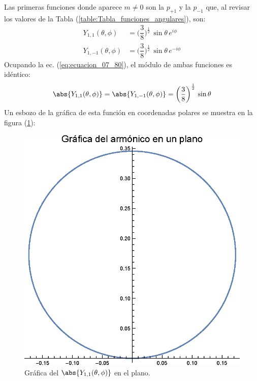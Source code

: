 Las primeras funciones donde aparece $m \neq 0$ son la $p_{+1}$ y la $p_{-1}$ que, al revisar los valores de la Tabla (\ref{table:Tabla_funciones_angulares}), son:
\begin{align}
Y_{1, 1} (\theta, \phi) &= \bigg( \dfrac{3}{8} \bigg)^{\frac{1}{2}} \, \sin \theta \, e^{i \phi} \label{eq:ecuacion_07_81} \\[0.5em]
Y_{1, -1} (\theta, \phi) &= \bigg( \dfrac{3}{8} \bigg)^{\frac{1}{2}} \, \sin \theta \, e^{-i \phi} \label{eq:ecuacion_07_82}
\end{align}
Ocupando la ec. (\ref{eq:ecuacion_07_80}), el módulo de ambas funciones es idéntico:
\begin{align}
\abs{Y_{1, 1} (\theta, \phi)} = \abs{Y_{1, -1} (\theta, \phi)} = \bigg( \dfrac{3}{8} \bigg)^{\frac{1}{2}} \, \sin \theta
\label{eq:ecuacion_07_83}
\end{align}
Un esbozo de la gráfica de esta función en coordenadas polares se muestra en la figura (\ref{fig:figura_plot_Y11_01}):
\begin{figure}[H]
    \centering
    \includegraphics[scale=0.75]{Imagenes/Plot_Y11_01.eps}
    \caption{Gráfica del $\abs{Y_{1, 1} (\theta, \phi)}$ en el plano.}
    \label{fig:figura_plot_Y11_01}
\end{figure}
